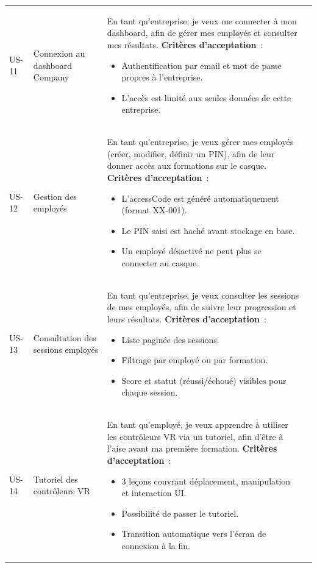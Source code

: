 \begin{longtable}{lp{2.8cm}p{8cm}l}
  US-11 & Connexion au dashboard Company &
    En tant qu'entreprise, je veux me connecter à mon dashboard, afin
    de gérer mes employés et consulter mes résultats.
    \newline\textbf{Critères d'acceptation}~:
    \begin{itemize}
      \item Authentification par email et mot de passe propres à
        l'entreprise.
      \item L'accès est limité aux seules données de cette entreprise.
    \end{itemize}
    & \must{} \\[4pt]

  US-12 & Gestion des employés &
    En tant qu'entreprise, je veux gérer mes employés (créer,
    modifier, définir un PIN), afin de leur donner accès aux
    formations sur le casque.
    \newline\textbf{Critères d'acceptation}~:
    \begin{itemize}
      \item L'accessCode est généré automatiquement (format XX-001).
      \item Le PIN saisi est haché avant stockage en base.
      \item Un employé désactivé ne peut plus se connecter au casque.
    \end{itemize}
    & \must{} \\[4pt]

  US-13 & Consultation des sessions employés &
    En tant qu'entreprise, je veux consulter les sessions de mes
    employés, afin de suivre leur progression et leurs résultats.
    \newline\textbf{Critères d'acceptation}~:
    \begin{itemize}
      \item Liste paginée des sessions.
      \item Filtrage par employé ou par formation.
      \item Score et statut (réussi/échoué) visibles pour chaque session.
    \end{itemize}
   & \should{} \\[4pt]

  US-14 & Tutoriel des contrôleurs VR &
    En tant qu'employé, je veux apprendre à utiliser les contrôleurs
    VR via un tutoriel, afin d'être à l'aise avant ma première
    formation.
    \newline\textbf{Critères d'acceptation}~:
    \begin{itemize}
      \item 3 leçons couvrant déplacement, manipulation et interaction UI.
      \item Possibilité de passer le tutoriel.
      \item Transition automatique vers l'écran de connexion à la fin.
    \end{itemize}
    & \must{} \\[4pt]


\end{longtable}

